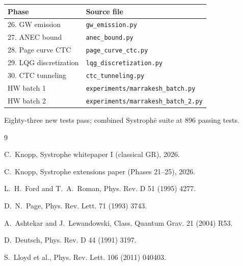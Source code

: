 \documentclass[11pt,a4paper]{article}
\begin{document}
\begin{center}
\begin{tabular}{ll}
\toprule
Phase & Source file \\
\midrule
26. GW emission & \texttt{gw\_emission.py} \\
27. ANEC bound & \texttt{anec\_bound.py} \\
28. Page curve CTC & \texttt{page\_curve\_ctc.py} \\
29. LQG discretization & \texttt{lqg\_discretization.py} \\
30. CTC tunneling & \texttt{ctc\_tunneling.py} \\
HW batch 1 & \texttt{experiments/marrakesh\_batch.py} \\
HW batch 2 & \texttt{experiments/marrakesh\_batch\_2.py} \\
\bottomrule
\end{tabular}
\end{center}

Eighty-three new tests pass; combined Systroph\=e suite at 896
passing tests.


\begin{thebibliography}{9}

C.~Knopp, Systrophe whitepaper I (classical GR), 2026.

C.~Knopp, Systrophe extensions paper (Phases 21--25), 2026.

L.~H.~Ford and T.~A.~Roman, Phys. Rev. D 51 (1995) 4277.

D.~N.~Page, Phys. Rev. Lett. 71 (1993) 3743.

A.~Ashtekar and J.~Lewandowski, Class. Quantum Grav. 21 (2004) R53.

D.~Deutsch, Phys. Rev. D 44 (1991) 3197.

S.~Lloyd et al., Phys. Rev. Lett. 106 (2011) 040403.

\end{thebibliography}
\end{document}
